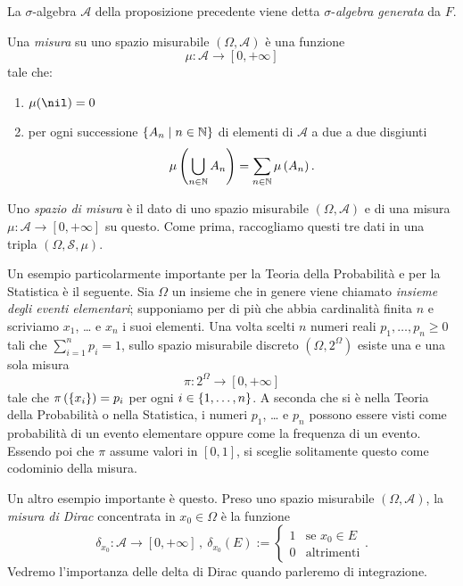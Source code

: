 \begin{definizione}
La \(\sigma\)-algebra \(\mathcal A\) della proposizione precedente viene detta \(\sigma\)-{\em algebra generata} da \(F\).
\end{definizione}

\begin{definizione}
Una {\em misura} su uno spazio misurabile \((\Omega, \mathcal A)\) è una funzione
\[\mu : \mathcal A \to [0, +\infty]\]
tale che:
\begin{enumerate}
\item \(\mu (\nil) = 0\)
\item per ogni successione \(\left\{A_n \mid n \in \mathbb N\right\}\) di elementi di \(\mathcal A\) a due a due disgiunti
\[\mu \left( \bigcup_{n \in \mathbb N} A_n \right) = \sum_{n \in \mathbb N} \mu \left( A_n \right).\]
\end{enumerate}
Uno {\em spazio di misura} è il dato di uno spazio misurabile \((\Omega, \mathcal A)\) e di una misura \(\mu : \mathcal A \to [0, +\infty]\) su questo. Come prima, raccogliamo questi tre dati in una tripla \((\Omega, \mathcal S, \mu)\).
\end{definizione}


\begin{esempio}
Un esempio particolarmente importante per la Teoria della Probabilità e per la Statistica è il seguente. Sia \(\Omega\) un insieme che in genere viene chiamato {\em insieme degli eventi elementari}; supponiamo per di più che abbia cardinalità finita \(n\) e scriviamo \(x_1\), \dots{} e \(x_n\) i suoi elementi. Una volta scelti \(n\) numeri reali \(p_1, \dots{}, p_n \ge 0\) tali che \(\sum_{i=1}^n p_i = 1\), sullo spazio misurabile discreto \((\Omega, 2^\Omega)\) esiste una e una sola misura
\[\pi : 2^\Omega \to [0, +\infty]\]
tale che \(\pi\left(\left\{x_i\right\}\right) = p_i\) per ogni \(i \in \left\{1, \dots{}, n\right\}\). A seconda che si è nella Teoria della Probabilità o nella Statistica, i numeri \(p_1\), \dots{} e \(p_n\) possono essere visti come probabilità di un evento elementare oppure come la frequenza di un evento. Essendo poi che \(\pi\) assume valori in \([0, 1]\), si sceglie solitamente questo come codominio della misura.
\end{esempio}

\begin{esempio}
Un altro esempio importante è questo. Preso uno spazio misurabile \((\Omega, \mathcal A)\), la {\em misura di Dirac} concentrata in \(x_0 \in \Omega\) è la funzione
\[\delta_{x_0} : \mathcal A \to [0, +\infty]\,, \ \delta_{x_0}(E) := \begin{cases} 1 & \text{se } x_0 \in E \\ 0 & \text{altrimenti} \end{cases}.\]
Vedremo l'importanza delle delta di Dirac quando parleremo di integrazione.
\end{esempio}

